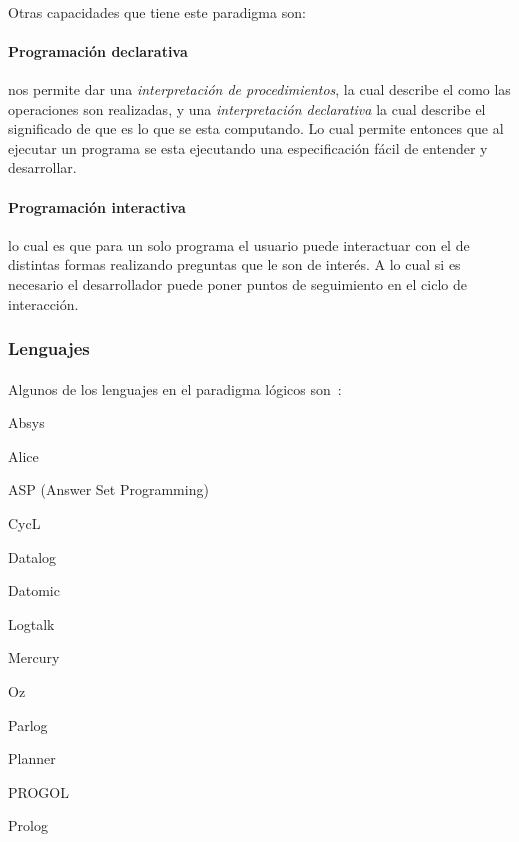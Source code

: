 \documentclass[12pt]{article}
\begin{document}
	\paragraph{}Otras capacidades que tiene este paradigma son:
	\paragraph{Programación declarativa}  nos permite dar una \textit{interpretación de procedimientos}, la cual describe el como las operaciones son realizadas, y una \textit{interpretación declarativa} la cual describe el significado de que es lo que se esta computando. Lo cual permite entonces que al ejecutar un programa se esta ejecutando una especificación fácil de entender y desarrollar.
	\paragraph{Programación interactiva}  lo cual es que para un solo programa el usuario puede interactuar con el de distintas formas realizando preguntas que le son de interés. A lo cual si es necesario el desarrollador puede poner puntos de seguimiento en el ciclo de interacción.
		
		\subsubsection{Lenguajes}
		\paragraph{}
		Algunos de los lenguajes en el paradigma lógicos son~\cite{computer_hope}:

		\begin{list}{}{}
\item Absys
\item Alice
\item ASP (Answer Set Programming)
\item CycL
\item Datalog
\item Datomic
\item Logtalk
\item Mercury
\item Oz
\item Parlog
\item Planner
\item PROGOL
\item Prolog
	\end{list}
		
\end{document}
